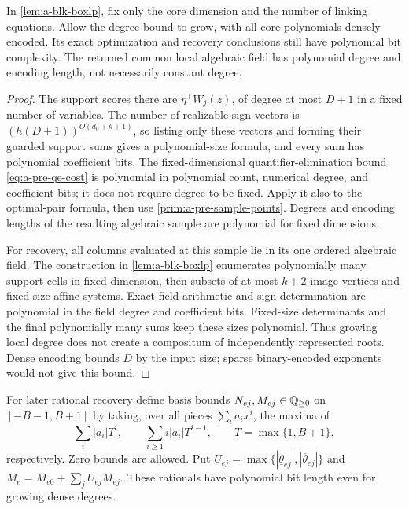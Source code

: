 \begin{lemma}
\label{lem:a-law-dense}
In \cref{lem:a-blk-boxlp}, fix only the core dimension and the number
of linking equations. Allow the degree bound to grow, with all core
polynomials densely encoded. Its exact optimization and recovery
conclusions still have polynomial bit complexity. The returned common
local algebraic field has polynomial degree and encoding length, not
necessarily constant degree.
\end{lemma}
\begin{proof}
The support scores there are $\eta^\top W_j(z)$, of degree at most
$D+1$ in a fixed number of variables. The number of realizable sign
vectors is $(h(D+1))^{O(d_0+k+1)}$, so listing only these vectors and
forming their guarded support sums gives a polynomial-size formula, and
every sum has polynomial coefficient bits. The fixed-dimensional
quantifier-elimination bound \cref{eq:a-pre-qe-cost} is polynomial in
polynomial count, numerical degree, and coefficient bits; it does not
require degree to be fixed. Apply it also to the optimal-pair formula,
then use \cref{prim:a-pre-sample-points}. Degrees and encoding lengths
of the resulting algebraic sample are polynomial for fixed dimensions.

For recovery, all columns evaluated at this sample lie in its one
ordered algebraic field. The construction in \cref{lem:a-blk-boxlp}
enumerates polynomially many support cells in fixed dimension, then
subsets of at most $k+2$ image vertices and fixed-size affine systems.
Exact field arithmetic and sign determination are polynomial in the
field degree and coefficient bits. Fixed-size determinants and the
final polynomially many sums keep these sizes polynomial. Thus growing
local degree does not create a compositum of independently represented
roots. Dense encoding bounds $D$ by the input size; sparse
binary-encoded exponents would not give this bound.
\end{proof}

For later rational recovery define basis bounds $N_{ej},M_{ej}\in\mathbb{Q}_{\ge0}$
on $[-B-1,B+1]$ by taking, over all pieces $\sum_i a_ix^i$, the maxima of
\[
 \sum_i|a_i|T^i,\qquad
 \sum_{i\ge1}i|a_i|T^{i-1},\qquad T=\max\{1,B+1\},
\]
respectively. Zero bounds are allowed. Put
$U_{ej}=\max\{|\underline\theta_{ej}|,|\overline\theta_{ej}|\}$ and
$M_e=M_{e0}+\sum_jU_{ej}M_{ej}$. These rationals have polynomial bit
length even for growing dense degrees.

